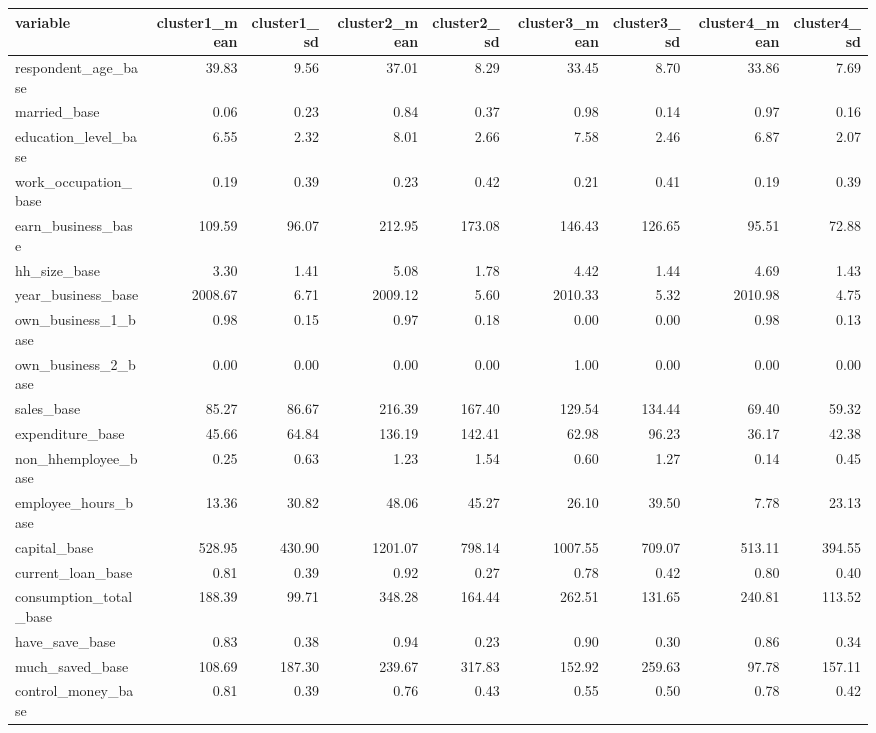 
\begin{tabular}{lrrrrrrrr}
\toprule
variable & cluster1\_mean & cluster1\_sd & cluster2\_mean & cluster2\_sd & cluster3\_mean & cluster3\_sd & cluster4\_mean & cluster4\_sd\\
\midrule
respondent\_age\_base & 39.83 & 9.56 & 37.01 & 8.29 & 33.45 & 8.70 & 33.86 & 7.69\\
married\_base & 0.06 & 0.23 & 0.84 & 0.37 & 0.98 & 0.14 & 0.97 & 0.16\\
education\_level\_base & 6.55 & 2.32 & 8.01 & 2.66 & 7.58 & 2.46 & 6.87 & 2.07\\
work\_occupation\_base & 0.19 & 0.39 & 0.23 & 0.42 & 0.21 & 0.41 & 0.19 & 0.39\\
earn\_business\_base & 109.59 & 96.07 & 212.95 & 173.08 & 146.43 & 126.65 & 95.51 & 72.88\\
\addlinespace
hh\_size\_base & 3.30 & 1.41 & 5.08 & 1.78 & 4.42 & 1.44 & 4.69 & 1.43\\
year\_business\_base & 2008.67 & 6.71 & 2009.12 & 5.60 & 2010.33 & 5.32 & 2010.98 & 4.75\\
own\_business\_1\_base & 0.98 & 0.15 & 0.97 & 0.18 & 0.00 & 0.00 & 0.98 & 0.13\\
own\_business\_2\_base & 0.00 & 0.00 & 0.00 & 0.00 & 1.00 & 0.00 & 0.00 & 0.00\\
sales\_base & 85.27 & 86.67 & 216.39 & 167.40 & 129.54 & 134.44 & 69.40 & 59.32\\
\addlinespace
expenditure\_base & 45.66 & 64.84 & 136.19 & 142.41 & 62.98 & 96.23 & 36.17 & 42.38\\
non\_hhemployee\_base & 0.25 & 0.63 & 1.23 & 1.54 & 0.60 & 1.27 & 0.14 & 0.45\\
employee\_hours\_base & 13.36 & 30.82 & 48.06 & 45.27 & 26.10 & 39.50 & 7.78 & 23.13\\
capital\_base & 528.95 & 430.90 & 1201.07 & 798.14 & 1007.55 & 709.07 & 513.11 & 394.55\\
current\_loan\_base & 0.81 & 0.39 & 0.92 & 0.27 & 0.78 & 0.42 & 0.80 & 0.40\\
\addlinespace
consumption\_total\_base & 188.39 & 99.71 & 348.28 & 164.44 & 262.51 & 131.65 & 240.81 & 113.52\\
have\_save\_base & 0.83 & 0.38 & 0.94 & 0.23 & 0.90 & 0.30 & 0.86 & 0.34\\
much\_saved\_base & 108.69 & 187.30 & 239.67 & 317.83 & 152.92 & 259.63 & 97.78 & 157.11\\
control\_money\_base & 0.81 & 0.39 & 0.76 & 0.43 & 0.55 & 0.50 & 0.78 & 0.42\\

\end{tabular}
